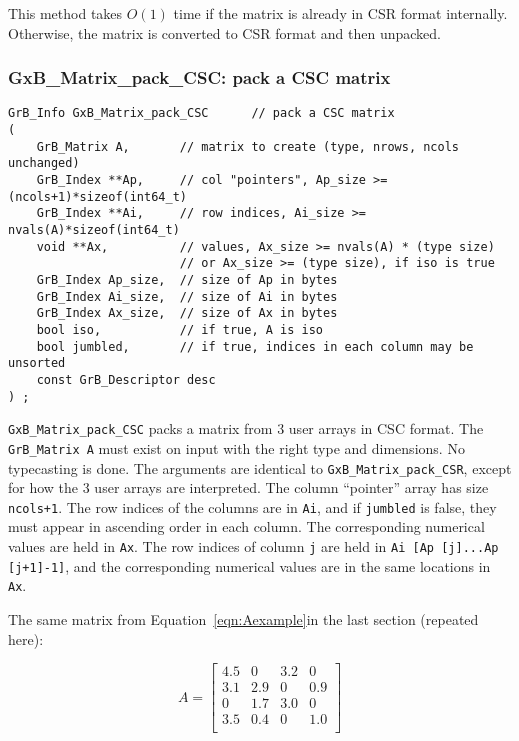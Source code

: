 \documentclass[12pt]{article}
\begin{document}
This method takes $O(1)$ time if the matrix is already in CSR format
internally.  Otherwise, the matrix is converted to CSR format and then
unpacked.

\newpage
\subsubsection{{\sf GxB\_Matrix\_pack\_CSC:} pack a CSC matrix}
\label{matrix_pack_csc}

\begin{mdframed}[userdefinedwidth=6in]
{\footnotesize
\begin{verbatim}
GrB_Info GxB_Matrix_pack_CSC      // pack a CSC matrix
(
    GrB_Matrix A,       // matrix to create (type, nrows, ncols unchanged)
    GrB_Index **Ap,     // col "pointers", Ap_size >= (ncols+1)*sizeof(int64_t)
    GrB_Index **Ai,     // row indices, Ai_size >= nvals(A)*sizeof(int64_t)
    void **Ax,          // values, Ax_size >= nvals(A) * (type size)
                        // or Ax_size >= (type size), if iso is true
    GrB_Index Ap_size,  // size of Ap in bytes
    GrB_Index Ai_size,  // size of Ai in bytes
    GrB_Index Ax_size,  // size of Ax in bytes
    bool iso,           // if true, A is iso
    bool jumbled,       // if true, indices in each column may be unsorted
    const GrB_Descriptor desc
) ;
\end{verbatim}
} \end{mdframed}

\verb'GxB_Matrix_pack_CSC' packs a matrix from 3 user arrays in CSC format.
The \verb'GrB_Matrix A' must exist on input with the right type and dimensions.
No typecasting is done.
The arguments are identical to
\verb'GxB_Matrix_pack_CSR', except for how the 3 user arrays are
interpreted.  The column ``pointer'' array has size \verb'ncols+1'.  The row
indices of the columns are in \verb'Ai', and if \verb'jumbled' is false,
they must appear in ascending order in
each column.  The corresponding numerical values are held in \verb'Ax'.  The
row indices of column \verb'j' are held in \verb'Ai [Ap [j]...Ap [j+1]-1]',
and the corresponding numerical values are in the same locations in \verb'Ax'.

The same matrix from Equation~\ref{eqn:Aexample}in
the last section (repeated here):

    \begin{equation}
    A = \left[
    \begin{array}{cccc}
    4.5 &   0 & 3.2 &   0 \\
    3.1 & 2.9 &  0  & 0.9 \\
     0  & 1.7 & 3.0 &   0 \\
    3.5 & 0.4 &  0  & 1.0 \\
    \end{array}
    \right]
    \end{equation}
\end{document}
